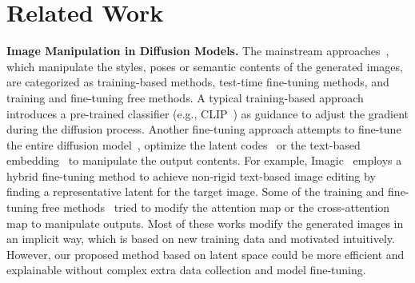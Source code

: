 \section{Related Work}

\textbf{Image Manipulation in Diffusion Models.} The mainstream approaches~\cite{huang2024diffusion}, which manipulate the styles, poses or semantic contents of the generated images, are categorized as training-based methods, test-time fine-tuning methods, and training and fine-tuning free methods. A typical training-based approach~\cite{kim2022diffusionclip, wang2023stylediffusion, huang2024diffstyler} introduces a pre-trained classifier (e.g., CLIP~\cite{radford2021learning}) as guidance to adjust the gradient during the diffusion process. Another fine-tuning approach attempts to fine-tune the entire diffusion model~\cite{valevski2023unitune, choi2023custom, huang2023kv}, optimize the latent codes~\cite{mou2023dragondiffusion, shi2024dragdiffusion, nam2024contrastive, yang2023magicremover} or the text-based embedding~\cite{wu2023uncovering, dong2023prompt} to manipulate the output contents. For example, Imagic~\cite{kawar2023imagic} employs a hybrid fine-tuning method to achieve non-rigid text-based image editing by finding a representative latent for the target image. Some of the training and fine-tuning free methods~\cite{kim2023user, elarabawy2022direct, huberman2024edit, gholami2023diffusion, patashnik2023localizing, park2024shape} tried to modify the attention map or the cross-attention map to manipulate outputs. Most of these works modify the generated images in an implicit way, which is based on new training data and motivated intuitively. However, our proposed method based on latent space could be more efficient and explainable without complex extra data collection and model fine-tuning. %

